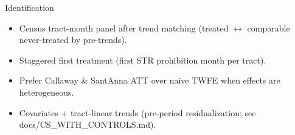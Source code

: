 \begin{frame}{Identification}
\begin{itemize}
  \item Census tract-month panel after trend matching (treated \(\leftrightarrow\) comparable never-treated by pre-trends).
  \item Staggered first treatment (first STR prohibition month per tract).
  \item Prefer Callaway \& Sant\textquotesingle Anna ATT over naive TWFE when effects are heterogeneous.
  \item Covariates + tract-linear trends (pre-period residualization; see docs/CS\_WITH\_CONTROLS.md).
\end{itemize}
\end{frame}
